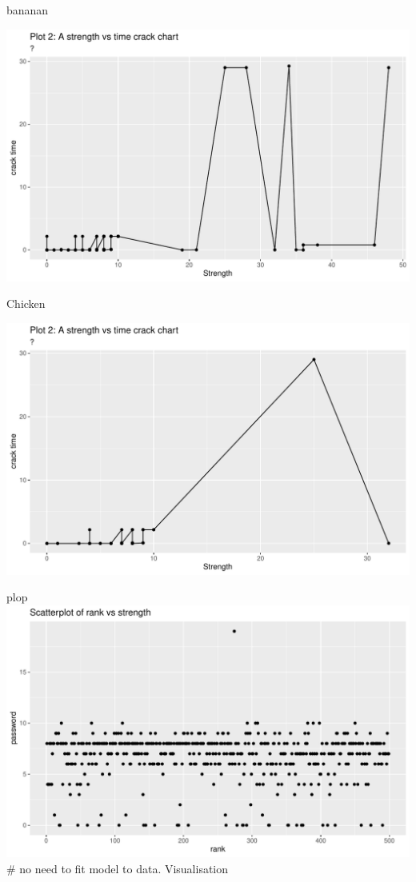 \documentclass[10pt,ignorenonframetext,aspectratio=169]{beamer}
\begin{document}
\begin{frame}{bananan}
\protect\hypertarget{bananan}{}
\begin{center}\includegraphics{Untitled_files/figure-beamer/plot2-1} \end{center}
\end{frame}

\begin{frame}{Chicken}
\protect\hypertarget{chicken}{}
\begin{center}\includegraphics{Untitled_files/figure-beamer/plot2d-1} \end{center}
\end{frame}

\begin{frame}{plop}
\protect\hypertarget{plop}{}
\includegraphics{Untitled_files/figure-beamer/scatterAttempt-1.pdf} \#
no need to fit model to data. Visualisation
\end{frame}
\end{document}
